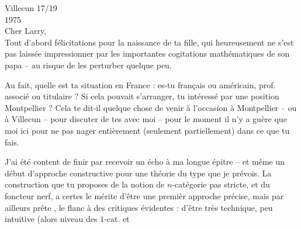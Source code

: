 \hfill Villecun 17/19 \\
\hfill 1975\\
Cher Larry,\\

Tout d'abord félicitations pour la naissance de ta fille, qui heureusement ne s'est pas laissée impressionner par les importantes cogitations mathématiques de son papa -- au risque de les perturber quelque peu.

Au fait, quelle est ta situation en France : es-tu français ou américain, prof. associé ou titulaire ? Si cela pouvait s'arranger,  tu intéressé par une position  Montpellier ? Cela te dit-il quelque chose de venir à l'occasion à Montpellier -- ou à Villecun -- pour discuter de tes  avec moi -- pour le moment il n'y a guère que moi ici pour ne pas nager entièrement (seulement partiellement) dans ce que tu fais.

J'ai été content de finir par recevoir un écho à ma longue épitre -- et même un début d'approche constructive pour  une théorie du type que je prévois. La construction que tu proposes de la notion de $n$-catégorie pas stricte, et du foncteur nerf, a certes le mérite  d'être une premièr approche précise, mais par ailleurs prête  , le flanc à des critiques évidentes : d'être très technique, peu intuitive (alors  niveau des $1$-cat. et
